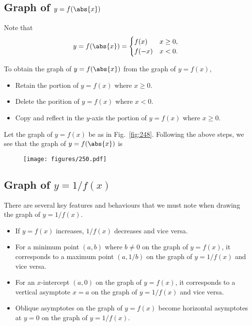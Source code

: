 \subsection{Graph of $y = f(\abs{x})$}

Note that \[y = f(\abs{x}) = \begin{cases}
    f(x) & x \geq 0,\\
    f(-x) & x < 0.
\end{cases}\]

\begin{recipe}[Graph of $y = f(\abs{x})$]
    To obtain the graph of $y = f(\abs{x})$ from the graph of $y = f(x)$,
    \begin{itemize}
        \item Retain the portion of $y = f(x)$ where $x \geq 0$.
        \item Delete the porition of $y = f(x)$ where $x < 0$.
        \item Copy and reflect in the $y$-axis the portion of $y = f(x)$ where $x \geq 0$.
    \end{itemize}
\end{recipe}

\begin{example}[Graph of $y = f(\abs{x})$]
    Let the graph of $y = f(x)$ be as in Fig.~\ref{fig:248}. Following the above steps, we see that the graph of $y = f(\abs{x})$ is
    \begin{figure}[H]
        \centering
        \hspace{7em}\texttt{[image: figures/250.pdf]}
        \caption{}
    \end{figure}
\end{example}

\subsection{Graph of $y = 1/f(x)$}

There are several key features and behaviours that we must note when drawing the graph of $y = 1/f(x)$.

\begin{itemize}
    \item If $y = f(x)$ increases, $1/f(x)$ decreases and vice versa.
    \item For a minimum point $(a,b)$ where $b \neq 0$ on the graph of $y = f(x)$, it corresponds to a maximum point $(a, 1/b)$ on the graph of $y = 1/f(x)$ and vice versa.
    \item For an $x$-intercept $(a, 0)$ on the graph of $y = f(x)$, it corresponds to a vertical asymptote $x = a$ on the graph of $y = 1/f(x)$ and vice versa.
    \item Oblique asymptotes on the graph of $y = f(x)$ become horizontal asymptotes at $y = 0$ on the graph of $y = 1/f(x)$.
\end{itemize}

